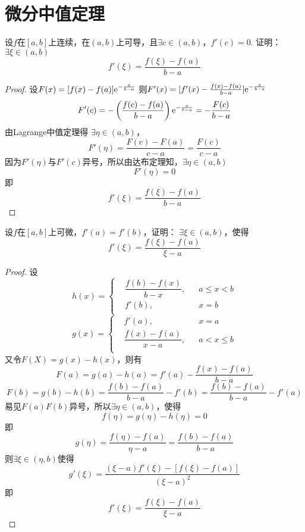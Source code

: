 \section{微分中值定理}

\begin{proposition}
    
    设$f$在$[a,b]$上连续，在$(a,b)$上可导，且$\exists c\in (a,b)$，$f'(c)=0$.
    证明：$\exists \xi \in (a,b)$
    $$f'(\xi) = \dfrac{f(\xi)-f(a)}{b-a}$$

\end{proposition}

\begin{proof}
    
    设$F(x)= [f(x)-f(a)]\mathrm{e}^{-\frac{x}{b-a}}$
    则$F'(x)=[f'(x)-\frac{f(x)-f(a)}{b-a}]\mathrm{e}^{-\frac{x}{b-a}}$
    $$F'(c)= -\left(\dfrac{f(c)-f(a)}{b-a}\right)\mathrm{e}^{-\frac{x}{b-a}}=-\dfrac{F(c)}{b-a}$$
    由\textup{Lagrange}中值定理得
    $\exists \eta \in (a,b)$，
    $$F'(\eta) = \dfrac{F(c)-F(a)}{c-a} = \dfrac{F(c)}{c-a}$$
    因为$F'(\eta)$与$F'(c)$异号，所以由达布定理知，$\exists \eta \in (a,b)$
    $$F'(\eta) = 0$$
    即
    $$f'(\xi) = \dfrac{f(\xi)-f(a)}{b-a}$$

\end{proof}

\begin{theorem}[Flett中值定理]
    
    设$f$在$[a,b]$上可微，$f'(a)=f'(b)$，证明：
    $\exists \xi \in (a,b)$，使得
    $$f'(\xi) = \dfrac{f(\xi)-f(a)}{\xi - a}$$

\end{theorem}

\begin{proof}
    
    设$$h(x)=\left\{
        \begin{aligned}
            &\dfrac{f(b)-f(x)}{b-x}, &&a \leq x < b\\
            &f'(b), &&x = b\\
        \end{aligned}
    \right.
    $$
    $$g(x)=\left\{
        \begin{aligned}
            &f'(a), &&x = a\\
            &\dfrac{f(x)-f(a)}{x-a}, &&a < x \leq b\\
        \end{aligned}
    \right.
    $$
    又令$F(X)=g(x)-h(x)$，则有
    $$F(a) = g(a) - h(a) = f'(a) - \dfrac{f(x)-f(a)}{b-a}$$
    $$F(b) = g(b) - h(b) = \dfrac{f(b) - f(a)}{b-a}  - f'(b) = \dfrac{f(b) - f(a)}{b-a} - f'(a)$$
    易见$F(a)F(b)$异号，所以$\exists  \eta \in (a,b)$，使得
    $$ f(\eta) = g(\eta) -h(\eta) = 0$$
    即
    $$g(\eta) = \dfrac{f(\eta) - f(a)}{\eta - a }= \dfrac{f(b) - f(a)}{b-a}$$
    则$\exists \xi \in (\eta,b)$使得
    $$g'(\xi) = \dfrac{(\xi -a )f'(\xi)-[f(\xi) - f(a)]}{(\xi - a)^2}$$
    即
    $$f'(\xi) = \dfrac{f(\xi)-f(a)}{\xi - a}$$

\end{proof}

